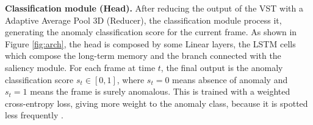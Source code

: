 \noindent\textbf{Classification module (Head).}
After reducing the output of the VST with a Adaptive Average Pool 3D (Reducer), the classification module process it, generating the anomaly classification score for the current frame.
As shown in Figure \ref{fig:arch}, the head is composed by some Linear layers, the LSTM cells which compose the long-term memory and the branch connected with the saliency module.
For each frame at time $t$, the final output is the anomaly classification score $s_t \in [0,1]$, where $s_t=0$ means absence of anomaly and $s_t=1$ means the frame is surely anomalous.
This is trained with a weighted cross-entropy loss, giving more weight to the anomaly class, because it is spotted less frequently .


